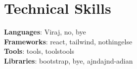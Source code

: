 \documentclass[letterpaper,11pt]{article}
\begin{document}
\section{Technical Skills}
\begin{itemize}[leftmargin=0.15in, label={}]
    \small{\item{
     \textbf{Languages}{: Viraj, no, bye} \\
     \textbf{Frameworks}{: react, tailwind, nothingelse} \\
     \textbf{Tools}{: tools, toolstools} \\
     \textbf{Libraries}{: bootstrap, bye, ajndajnd-adian}
    }}
\end{itemize}
\end{document}
